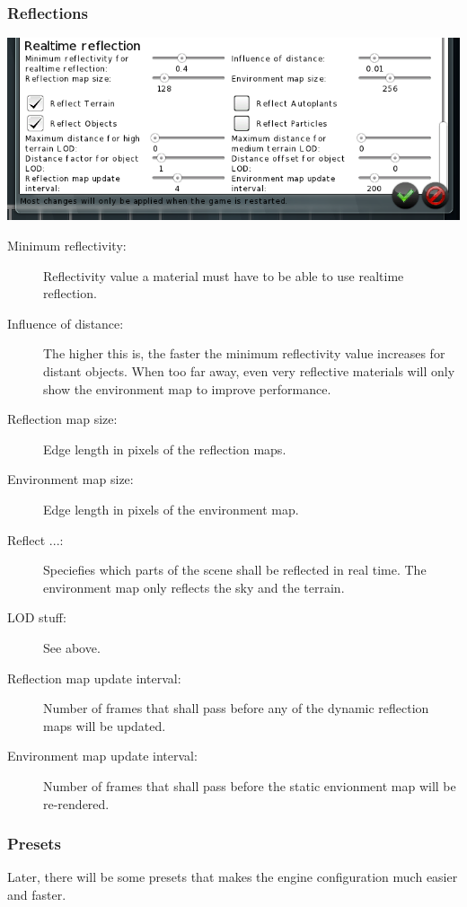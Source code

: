 \documentclass[a4paper]{article}
\begin{document}
\subsubsection{Reflections}
\includegraphics[width=140mm]{./images/settings-reflections.png}
\begin{description}
  \item[Minimum reflectivity:] Reflectivity value a material must have to be able to use realtime reflection.
  \item[Influence of distance:] The higher this is, the faster the minimum reflectivity value increases for distant objects. When too far away, even very reflective materials will only show the environment map to improve performance.
  \item[Reflection map size:] Edge length in pixels of the reflection maps.
  \item[Environment map size:] Edge length in pixels of the environment map.
  \item[Reflect ...:] Speciefies which parts of the scene shall be reflected in real time. The environment map only reflects the sky and the terrain.
  \item[LOD stuff:] See above.
  \item[Reflection map update interval:] Number of frames that shall pass before any of the dynamic reflection maps will be updated.
  \item[Environment map update interval:] Number of frames that shall pass before the static envionment map will be re-rendered.
\end{description}

\pagebreak[4]
\subsubsection{Presets}
Later, there will be some presets that makes the engine configuration much easier and faster.\nopagebreak
\end{document}
